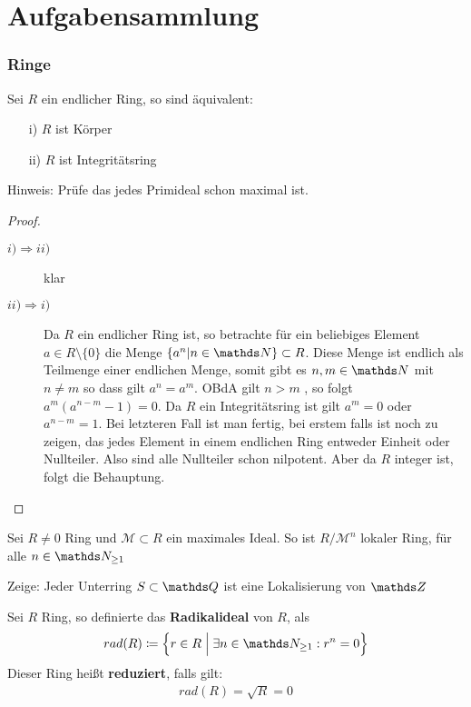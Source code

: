 \documentclass[ngerman, parskip=half, titlepage=false]{scrartcl}
\begin{document}
\part{Aufgabensammlung}

\section{Ringe}

\begin{Satz}
  Sei $R$ ein endlicher Ring, so sind äquivalent:\\
  \begin{itemize}
  \item[i)] $R$ ist Körper
  \item[ii)] $R$ ist Integritätsring
  \end{itemize}
Hinweis: Prüfe das jedes Primideal schon maximal ist.
\begin{proof}
  \begin{description}
    \item[$i) \Rightarrow ii)$] klar
    \item[$ii) \Rightarrow i)$] Da $R$ ein endlicher Ring ist, so
      betrachte für ein beliebiges Element $a \in R \setminus \{ 0 \}$
      die Menge $\{ a^n | n \in \N \} \subset R$. Diese Menge ist
      endlich als Teilmenge einer endlichen Menge, somit gibt es
      $n,m \in \N$ mit $n \neq m$ so dass gilt $a^n = a^m$. OBdA gilt
      $n > m$ , so folgt $a^m (a^{n-m} - 1) = 0$. Da $R$ ein Integritätsring ist
      gilt $a^m = 0$ oder $a^{n-m} = 1$. Bei letzteren Fall ist man fertig, bei 
      erstem falls ist noch zu zeigen, das jedes Element in einem endlichen Ring
      entweder Einheit oder Nullteiler. Also sind alle Nullteiler schon
      nilpotent. Aber da $R$ integer ist, folgt die Behauptung.
  \end{description}
\end{proof}
\end{Satz}

\begin{Satz}
  Sei $R \neq 0$ Ring und $\mathcal{M} \subset R$ ein maximales Ideal.
  So ist $R/\mathcal{M}^n$ lokaler Ring, für alle $n \in \N_{\geq 1}$
\end{Satz}

\begin{Satz}
  Zeige: Jeder Unterring $S \subset \Q$ ist eine Lokalisierung von $\Z$
\end{Satz}

\begin{Def}
  Sei $R$ Ring, so definierte das \textbf{Radikalideal} von $R$, als
  \begin{gather*}
    rad(R) \coloneqq \left\{ r \in R \; \Big| \; \exists n \in
      \N_{\geq 1} : r^n = 0 \right\}
  \end{gather*}
  Dieser Ring heißt \textbf{reduziert}, falls gilt:
  \begin{gather*}
    rad(R)=\sqrt{R} =0
  \end{gather*}
\end{Def}
\end{document}
